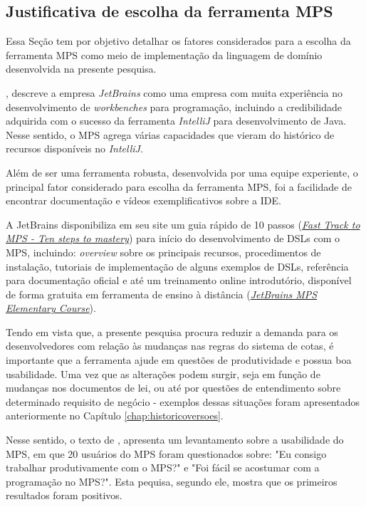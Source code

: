 
\subsection{Justificativa de escolha da ferramenta MPS}
\label{justificativamps}

Essa Seção tem por objetivo detalhar os fatores considerados para a escolha da ferramenta \gls{MPS} como meio de implementação da linguagem de domínio desenvolvida na presente pesquisa.

, descreve a empresa \textit{JetBrains} como uma empresa com muita experiência no desenvolvimento de \textit{workbenches} para programação, incluindo a credibilidade adquirida com o sucesso da ferramenta \textit{IntelliJ} para desenvolvimento de Java.  Nesse sentido, o \gls{MPS} agrega várias capacidades que vieram do histórico de recursos disponíveis no \textit{IntelliJ}. 

Além de ser uma ferramenta robusta, desenvolvida por uma equipe experiente, o principal fator considerado para escolha da ferramenta \gls{MPS}, foi a facilidade de encontrar documentação e vídeos exemplificativos sobre a \gls{IDE}. 

A JetBrains disponibiliza em seu site um guia rápido de 10 passos (\href{www.jetbrains.com/help/mps/fast-track-to-mps.html}{\textit{Fast Track to MPS - Ten steps to mastery}}) para início do desenvolvimento de \gls{DSL}s com o \gls{MPS}, incluindo: \textit{overview} sobre os principais recursos, procedimentos de instalação, tutoriais de implementação de alguns exemplos de \gls{DSL}s, referência para documentação oficial e até um treinamento online introdutório, disponível de forma gratuita em ferramenta de ensino à distância (\href{https://stepik.org/course/37360/promo}{\textit{JetBrains MPS Elementary Course}}).  


\newpage
Tendo em vista que, a presente pesquisa procura reduzir a demanda para os desenvolvedores com relação às mudanças nas regras do sistema de cotas, é importante que a ferramenta ajude em questões de produtividade e possua boa usabilidade. Uma vez que as alterações podem surgir, seja em função de mudanças nos documentos de lei, ou até por questões de entendimento sobre determinado requisito de negócio - exemplos dessas situações foram apresentados anteriormente no Capítulo \ref{chap:historicoversoes}.

Nesse sentido, o texto de  , apresenta um levantamento sobre a usabilidade do \gls{MPS}, em que 20 usuários do \gls{MPS} foram questionados sobre: "Eu consigo trabalhar produtivamente com o MPS?" e "Foi fácil se acostumar com a programação no MPS?". Esta pequisa, segundo ele, mostra que os primeiros resultados foram positivos. 

